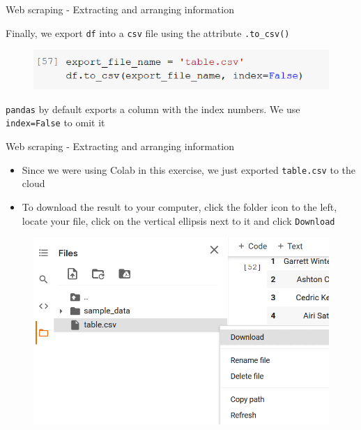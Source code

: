 \documentclass[aspectratio=169]{beamer}
\begin{document}
\begin{frame}{Web scraping - Extracting and arranging information}

	Finally, we export \texttt{df} into a \texttt{csv} file using the attribute \texttt{.to\_csv()}

	\begin{figure}
		\centering
		\includegraphics[width=0.6\linewidth]{img/df_to_csv.png}
	\end{figure}

	\texttt{pandas} by default exports a column with the index numbers. We use \texttt{index=False} to omit it 

\end{frame}

\begin{frame}{Web scraping - Extracting and arranging information}

	\begin{itemize}
		\item Since we were using Colab in this exercise, we just exported \texttt{table.csv} to the cloud
		\item To download the result to your computer, click the folder icon to the left, locate your file, click on the vertical ellipsis next to it and click \texttt{Download}
	\end{itemize}

	\begin{figure}
		\centering
		\includegraphics[width=0.5\linewidth]{img/colab_download.png}
	\end{figure}

\end{frame}
\end{document}
